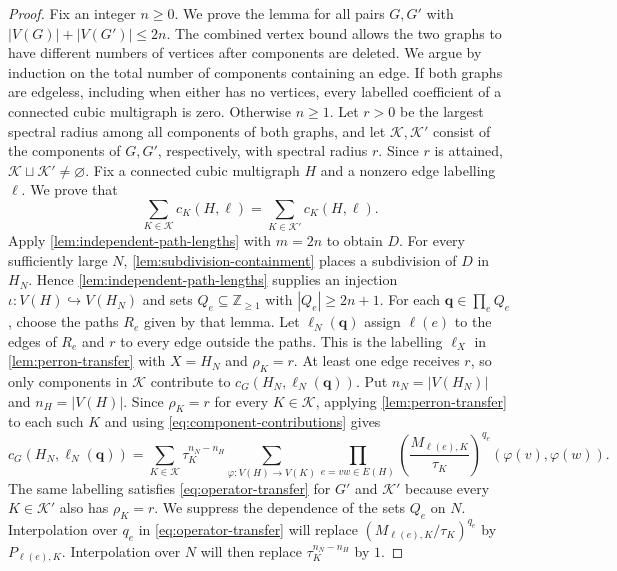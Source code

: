 \documentclass[11pt,a4paper]{article}
\theoremstyle{plain}
\theoremstyle{definition}
\newcommand{\Z}{\mathbb{Z}}
\begin{document}
\begin{proof}
Fix an integer $n\geq0$. We prove the lemma for all pairs $G,G'$ with
$|V(G)|+|V(G')|\leq2n$.
The combined vertex bound allows the two graphs to have different
numbers of vertices after components are deleted.
We argue by induction on the total number of components containing an edge.
If both graphs are edgeless, including when either has no vertices,
every labelled coefficient of a connected cubic multigraph is zero.
Otherwise $n\geq1$. Let $r>0$ be the largest spectral radius among all
components of both graphs, and let $\mathcal K,\mathcal K'$ consist of
the components of $G,G'$, respectively, with spectral radius $r$.
Since $r$ is attained, $\mathcal K\sqcup\mathcal K'\ne\varnothing$.
Fix a connected cubic multigraph $H$ and a nonzero edge labelling $\ell$.
We prove that
\begin{equation}\label{eq:layer-contractions}
 \sum_{K\in\mathcal K}c_K(H,\ell)
 =\sum_{K\in\mathcal K'}c_K(H,\ell).
\end{equation}
Apply \cref{lem:independent-path-lengths} with $m=2n$ to obtain $D$.
For every sufficiently large $N$, \cref{lem:subdivision-containment}
places a subdivision of $D$ in $H_N$.
Hence \cref{lem:independent-path-lengths} supplies an injection
$\iota:V(H)\hookrightarrow V(H_N)$ and sets
$Q_e\subseteq\Z_{\geq1}$ with $|Q_e|\geq2n+1$.
For each $\mathbf q\in\prod_eQ_e$, choose the paths $R_e$ given by that
lemma. Let $\ell_N(\mathbf q)$ assign $\ell(e)$ to the edges of $R_e$
and $r$ to every edge outside the paths.
This is the labelling $\ell_X$ in \cref{lem:perron-transfer} with
$X=H_N$ and $\rho_K=r$.
At least one edge receives $r$, so only components in $\mathcal K$
contribute to $c_G(H_N,\ell_N(\mathbf q))$.
Put $n_N=|V(H_N)|$ and $n_H=|V(H)|$.
Since $\rho_K=r$ for every $K\in\mathcal K$, applying
\cref{lem:perron-transfer} to each such $K$ and using
\cref{eq:component-contributions} gives
\begin{equation}\label{eq:operator-transfer}
 c_G(H_N,\ell_N(\mathbf q))=\sum_{K\in\mathcal K}\tau_K^{n_N-n_H}
   \sum_{\varphi:V(H)\to V(K)}
   \prod_{e=vw\in E(H)}
       \left(\frac{M_{\ell(e),K}}{\tau_K}\right)^{q_e}(\varphi(v),\varphi(w)).
\end{equation}
The same labelling satisfies \cref{eq:operator-transfer} for $G'$ and
$\mathcal K'$ because every $K\in\mathcal K'$ also has $\rho_K=r$.
We suppress the dependence of the sets $Q_e$ on $N$.
Interpolation over $q_e$ in \cref{eq:operator-transfer} will replace
$(M_{\ell(e),K}/\tau_K)^{q_e}$ by $P_{\ell(e),K}$.
Interpolation over $N$ will then replace $\tau_K^{n_N-n_H}$ by $1$.


\end{proof}
\end{document}
